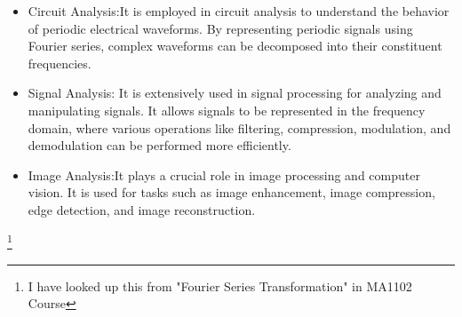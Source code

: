 \documentclass{article}
\begin{document}
\begin{itemize}
\item Circuit Analysis:It is employed in circuit analysis to understand the behavior of periodic electrical waveforms. By representing periodic signals using Fourier series, complex waveforms can be decomposed into their constituent frequencies. 
\item Signal Analysis: It is extensively used in signal processing for analyzing and manipulating signals. It allows signals to be represented in the frequency domain, where various operations like filtering, compression, modulation, and demodulation can be performed more efficiently.
\item Image Analysis:It plays a crucial role in image processing and computer vision. It is used for tasks such as image enhancement, image compression, edge detection, and image reconstruction.

\end{itemize}
\footnote{I have looked up this from "Fourier Series Transformation" in MA1102
 Course}
 
\end{document}
